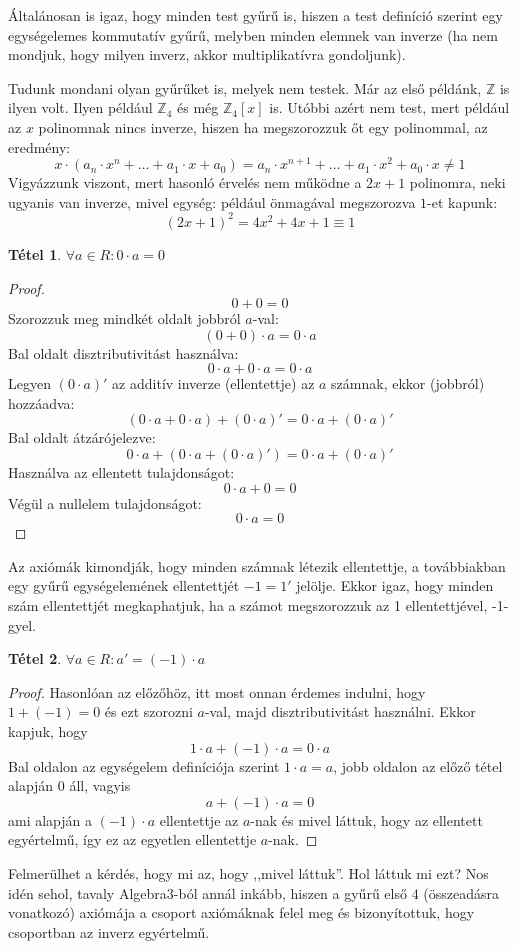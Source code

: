 \documentclass[12pt]{book}
\theoremstyle{plain} %
\theoremstyle{definition} %
\newtheorem{theo/}{Tétel}[section]
\newenvironment{theo}
  {\renewcommand{\qedsymbol}{$\clubsuit$}%
   \pushQED{\qed}\begin{theo/}}
  {\popQED\end{theo/}}
\theoremstyle{remark}
\renewcommand\qedsymbol{$\blacksquare$}
\numberwithin{equation}{section}  %
\begin{document}
	Általánosan is igaz, hogy minden test gyűrű is, hiszen a test definíció szerint egy egységelemes kommutatív gyűrű, melyben minden elemnek van inverze (ha nem mondjuk, hogy milyen inverz, akkor multiplikatívra gondoljunk).
	
	Tudunk mondani olyan gyűrűket is, melyek nem testek. Már az első példánk, $\mathbb{Z}$ is ilyen volt. Ilyen például $\mathbb{Z}_4$ és még $\mathbb{Z}_4[x]$ is. Utóbbi azért nem test, mert például az $x$ polinomnak nincs inverze, hiszen ha megszorozzuk őt egy polinommal, az eredmény:
	\[ x\cdot (a_n\cdot x^n + \ldots + a_1 \cdot x + a_0) = a_n\cdot x^{n+1} + \ldots + a_1 \cdot x^2 + a_0\cdot x \neq 1 \]
	Vigyázzunk viszont, mert hasonló érvelés nem működne a $2x+1$ polinomra, neki ugyanis van inverze, mivel egység: például önmagával megszorozva $1$-et kapunk:
	\[ (2x+1)^2 = 4x^2+4x+1 \equiv 1 \]
	\begin{theo}
		$\forall a\in R\colon 0 \cdot a = 0$
	\end{theo}
	\begin{proof}
		\[ 0+0=0 \]
		Szorozzuk meg mindkét oldalt jobbról $a$-val:
		\[ (0+0)\cdot a = 0\cdot a \]
		Bal oldalt disztributivitást használva:
		\[ 0\cdot a + 0\cdot a = 0\cdot a \]
		Legyen $(0\cdot a)'$ az additív inverze (ellentettje) az $a$ számnak, ekkor (jobbról) hozzáadva:
		\[ \left(0\cdot a + 0\cdot a\right) + (0\cdot a)' = 0\cdot a + (0\cdot a)' \]
		Bal oldalt átzárójelezve:
		\[ 0\cdot a + \left(0\cdot a + (0\cdot a)'\right) = 0\cdot a + (0\cdot a)' \]
		Használva az ellentett tulajdonságot:
		\[ 0\cdot a + 0 = 0 \]
		Végül a nullelem tulajdonságot:
		\[ 0\cdot a = 0 \]
	\end{proof}
	Az axiómák kimondják, hogy minden számnak létezik ellentettje, a továbbiakban egy gyűrű egységelemének ellentettjét $-1=1'$ jelölje. Ekkor igaz, hogy minden szám ellentettjét megkaphatjuk, ha a számot megszorozzuk az 1 ellentettjével, -1-gyel.
	\begin{theo}
		$\forall a\in R\colon a' = (-1)\cdot a$
	\end{theo}
	\begin{proof}
		Hasonlóan az előzőhöz, itt most onnan érdemes indulni, hogy $1+(-1)=0$ és ezt szorozni $a$-val, majd disztributivitást használni. Ekkor kapjuk, hogy
		\[ 1\cdot a + (-1)\cdot a = 0\cdot a \]
		Bal oldalon az egységelem definíciója szerint $1\cdot a = a$, jobb oldalon az előző tétel alapján $0$ áll, vagyis
		\[ a + (-1)\cdot a = 0 \]
		ami alapján a $(-1)\cdot a$ ellentettje az $a$-nak és mivel láttuk, hogy az ellentett egyértelmű, így ez az egyetlen ellentettje $a$-nak.
	\end{proof}
	Felmerülhet a kérdés, hogy mi az, hogy ,,mivel láttuk''. Hol láttuk mi ezt? Nos idén sehol, tavaly Algebra3-ból annál inkább, hiszen a gyűrű első $4$ (összeadásra vonatkozó) axiómája a csoport axiómáknak felel meg és bizonyítottuk, hogy csoportban az inverz egyértelmű.
	
\end{document}
